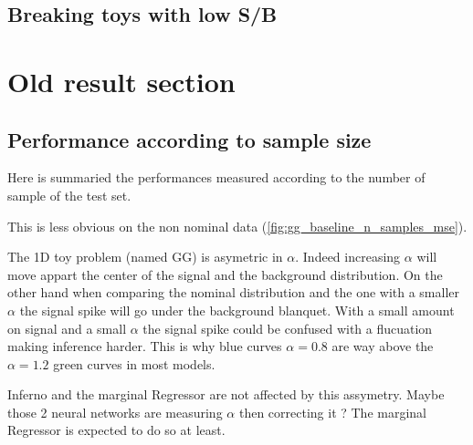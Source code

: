 \subsection{Breaking toys with low S/B}














\clearpage
\section{Old result section}


\subsection{Performance according to sample size} %
\label{sub:performance_according_to_sample_size}

Here is summaried the performances measured according to the number of sample of the test set.


This is less obvious on the non nominal data (\autoref{fig:gg_baseline_n_samples_mse}).

The 1D toy problem (named GG) is asymetric in $\alpha$.
Indeed increasing $\alpha$ will move appart the center of the signal and the background distribution.
On the other hand when comparing the nominal distribution and the one with a smaller $\alpha$ the signal spike will go under the background blanquet.
With a small amount on signal and a small $\alpha$ the signal spike could be confused with a flucuation making inference harder.
This is why blue curves $\alpha=0.8$ are way above the $\alpha=1.2$ green curves in most models.

Inferno and the marginal Regressor are not affected by this assymetry.
Maybe those 2 neural networks are measuring $\alpha$ then correcting it ?
The marginal Regressor is expected to do so at least.


